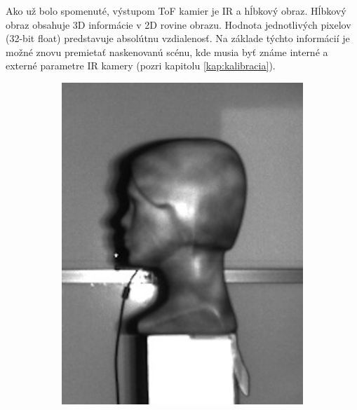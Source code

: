 Ako už bolo spomenuté, výstupom ToF kamier je IR a hĺbkový obraz.  Hĺbkový obraz obsahuje 3D informácie v 2D rovine obrazu. Hodnota jednotlivých pixelov (32-bit float) predstavuje absolútnu vzdialenosť. Na základe týchto informácií je možné znovu premietať naskenovanú scénu, kde musia byť známe interné a externé parametre IR kamery (pozri kapitolu \ref{kap:kalibracia}).

\begin{figure}[h]
	\centering
	\begin{subfigure}[b]{0.2\textwidth}
		\centering
		\includegraphics[width=\textwidth]{figures/depth_ir-a.png}
		\caption{}
		\label{fig:depthir:a}
	\end{subfigure}
	\hfill
	\begin{subfigure}[b]{0.2\textwidth}
		\centering

\end{subfigure}
\end{figure}
